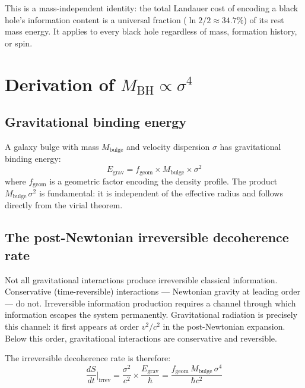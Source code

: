 \documentclass[12pt,a4paper]{article}
\begin{document}
This is a mass-independent identity: the total Landauer cost of encoding a black
hole's information content is a universal fraction ($\ln 2/2 \approx 34.7\%$) of
its rest mass energy. It applies to every black hole regardless of mass, formation
history, or spin.

\section{Derivation of $M_\mathrm{BH} \propto \sigma^4$}

\subsection{Gravitational binding energy}

A galaxy bulge with mass $M_\mathrm{bulge}$ and velocity dispersion $\sigma$ has
gravitational binding energy:
\begin{equation}
E_\mathrm{grav} = f_\mathrm{geom} \times M_\mathrm{bulge} \times \sigma^2
\end{equation}
where $f_\mathrm{geom}$ is a geometric factor encoding the density profile. The
product $M_\mathrm{bulge}\,\sigma^2$ is fundamental: it is independent of the
effective radius and follows directly from the virial theorem.

\subsection{The post-Newtonian irreversible decoherence rate}

Not all gravitational interactions produce irreversible classical information.
Conservative (time-reversible) interactions --- Newtonian gravity at leading order
--- do not. Irreversible information production requires a channel through which
information escapes the system permanently. Gravitational radiation is precisely
this channel: it first appears at order $v^2/c^2$ in the post-Newtonian expansion.
Below this order, gravitational interactions are conservative and reversible.

The irreversible decoherence rate is therefore:
\begin{equation}
\frac{dS}{dt}\bigg|_\mathrm{irrev} = \frac{\sigma^2}{c^2} \times \frac{E_\mathrm{grav}}{\hbar}
= \frac{f_\mathrm{geom}\, M_\mathrm{bulge}\, \sigma^4}{\hbar c^2}
\label{eq:irrev_rate}
\end{equation}
\end{document}
